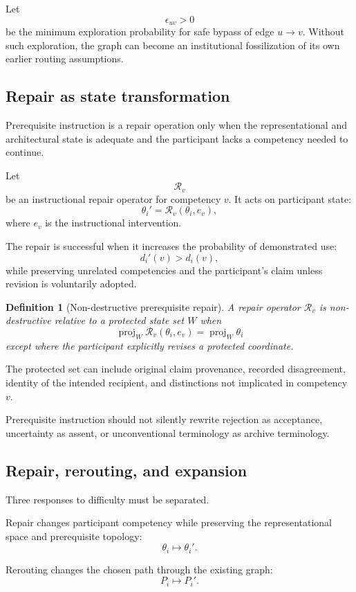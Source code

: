 \documentclass[11pt]{article}
\newtheorem{definition}{Definition}[section]
\theoremstyle{definition}
\begin{document}
Let
\[
\epsilon_{uv}>0
\]
be the minimum exploration probability for safe bypass of edge \(u\to v\). Without such exploration, the graph can become an institutional fossilization of its own earlier routing assumptions.

\subsection{Repair as state transformation}

Prerequisite instruction is a repair operation only when the representational and architectural state is adequate and the participant lacks a competency needed to continue.

Let
\[
\mathcal R_v
\]
be an instructional repair operator for competency \(v\). It acts on participant state:
\[
\theta_i'
=
\mathcal R_v(\theta_i,e_v),
\]
where \(e_v\) is the instructional intervention.

The repair is successful when it increases the probability of demonstrated use:
\[
d_i'(v)>d_i(v),
\]
while preserving unrelated competencies and the participant's claim unless revision is voluntarily adopted.

\begin{definition}[Non-destructive prerequisite repair]
A repair operator \(\mathcal R_v\) is non-destructive relative to a protected state set \(W\) when
\[
\operatorname{proj}_W
\mathcal R_v(\theta_i,e_v)
=
\operatorname{proj}_W\theta_i
\]
except where the participant explicitly revises a protected coordinate.
\end{definition}

The protected set can include original claim provenance, recorded disagreement, identity of the intended recipient, and distinctions not implicated in competency \(v\).

Prerequisite instruction should not silently rewrite rejection as acceptance, uncertainty as assent, or unconventional terminology as archive terminology.

\subsection{Repair, rerouting, and expansion}

Three responses to difficulty must be separated.

Repair changes participant competency while preserving the representational space and prerequisite topology:
\[
\theta_i
\mapsto
\theta_i'.
\]

Rerouting changes the chosen path through the existing graph:
\[
P_i
\mapsto
P_i'.
\]
\end{document}
